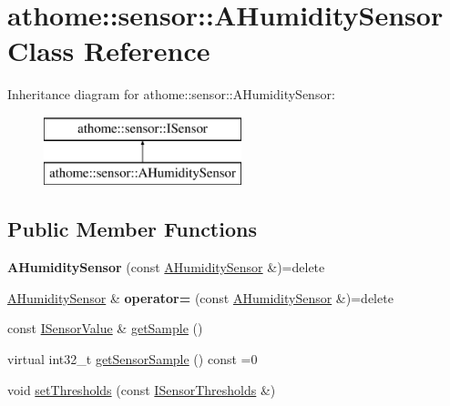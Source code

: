 \hypertarget{classathome_1_1sensor_1_1_a_humidity_sensor}{}\section{athome\+:\+:sensor\+:\+:A\+Humidity\+Sensor Class Reference}
\label{classathome_1_1sensor_1_1_a_humidity_sensor}
Inheritance diagram for athome\+:\+:sensor\+:\+:A\+Humidity\+Sensor\+:\begin{figure}[H]
\begin{center}
\leavevmode
\includegraphics[height=2.000000cm]{classathome_1_1sensor_1_1_a_humidity_sensor}
\end{center}
\end{figure}
\subsection*{Public Member Functions}
\begin{DoxyCompactItemize}
\item 
\mbox{\label{classathome_1_1sensor_1_1_a_humidity_sensor_aec2205040170bbf3c64fb1baf797795f}} 
{\bfseries A\+Humidity\+Sensor} (const \mbox{\hyperlink{classathome_1_1sensor_1_1_a_humidity_sensor}{A\+Humidity\+Sensor}} \&)=delete
\item 
\mbox{\label{classathome_1_1sensor_1_1_a_humidity_sensor_a530ebce44ecb090d32ab5450776f3c07}} 
\mbox{\hyperlink{classathome_1_1sensor_1_1_a_humidity_sensor}{A\+Humidity\+Sensor}} \& {\bfseries operator=} (const \mbox{\hyperlink{classathome_1_1sensor_1_1_a_humidity_sensor}{A\+Humidity\+Sensor}} \&)=delete
\item 
const \mbox{\hyperlink{structathome_1_1sensor_1_1_i_sensor_1_1_i_sensor_value}{I\+Sensor\+Value}} \& \mbox{\hyperlink{classathome_1_1sensor_1_1_a_humidity_sensor_a7af4527c70b539bec58cecfaae0aa80e}{get\+Sample}} ()
\item 
virtual int32\+\_\+t \mbox{\hyperlink{classathome_1_1sensor_1_1_a_humidity_sensor_a1eb32658be5cfc700523e74387e86053}{get\+Sensor\+Sample}} () const =0
\item 
void \mbox{\hyperlink{classathome_1_1sensor_1_1_a_humidity_sensor_a1a19bfee3db6b0940f1329b42d7ed0d0}{set\+Thresholds}} (const \mbox{\hyperlink{structathome_1_1sensor_1_1_i_sensor_1_1_i_sensor_thresholds}{I\+Sensor\+Thresholds}} \&)
\end{DoxyCompactItemize}
